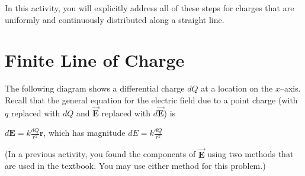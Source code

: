 \documentclass{article}
\newcommand{\bfvec}[1]{\vec{\mathbf{#1}}}
\begin{document}
In this activity, you will explicitly address all of these steps for charges that are uniformly and continuously distributed along a straight line.

\section{Finite Line of Charge}

The following diagram shows a differential charge $dQ$ at a location on the $x$--axis. Recall that the general equation for the electric field due to a point charge (with $q$ replaced with $dQ$ and $\bfvec{E}$ replaced with $d\bfvec{E}$) is

$\displaystyle d\mathbf{E} =k\frac{dQ}{r^2}\hat{\mathbf{r}}$, which has magnitude $\displaystyle dE = k\frac{dQ}{r^2}$

(In a previous activity, you found the components of $\bfvec{E}$ using two methods that are used in the textbook. You may use either method for this problem.)


\end{document}
